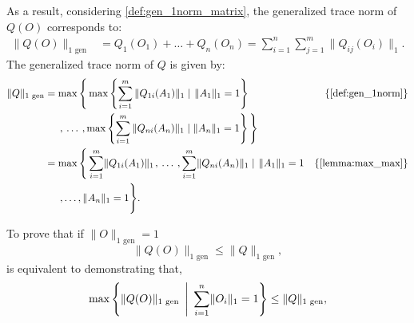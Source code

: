 As a result, considering \autoref{def:gen_1norm_matrix}, the generalized trace norm of $Q(O)$ corresponds to:
\begin{equation} \label{eq:qo}
  \begin{split}
  \lVert Q(O)  \rVert_{1 \text{ gen}} & = Q_1(O_1) + \ldots + Q_n(O_n)=  \sum_{i=1}^{n} \sum_{j=1}^{m} \lVert Q_{ij} (O_{i}) \rVert_{1}.
  \end{split}
\end {equation}
The generalized trace norm of $Q$ is given by:
\begin{equation}
  \begin{split} \label{eq:q}
  \lVert Q  \rVert_{1 \text{ gen}} & =   \max  \Bigg\{ \max \left\{ \sum_{i=1}^{m} \|Q_{1i} (A_1)\|_{1}   \mid \hspace{1pt} \|A_1\|_{1} = 1 \right\} & \{\text{\autoref{def:gen_1norm}}\} \\
  & \hspace{15pt} ,\hspace{2pt}  \ldots \hspace{2pt}  , \max \left\{ \sum_{i=1}^{m} \|Q_{ni} (A_n)\|_{1}   \mid \|A_n\|_{1} = 1 \right\} \Bigg\} \\
 & = \max \Bigg\{  \sum_{i=1}^{m}  \lVert Q_{1i} (A_{1}) \rVert_{1} \hspace{1pt} , \hspace{2pt} \ldots \hspace{2pt}, \sum_{i=1}^{m} \lVert Q_{ni} (A_{n}) \rVert_{1} \mid \hspace{1pt}   \lVert A_{1} \rVert_{1} = 1  & \{\text{\autoref{lemma:max_max}} \} \\
 & \hspace{15pt} , \ldots,\lVert A_{n} \rVert_{1} = 1 \Bigg\}.
  \end{split}
\end{equation}


To prove that  if  $\lVert O \rVert_{1 \text{ gen}} = 1$
\begin{equation}
  \lVert Q(O) \rVert_{1 \text{ gen}} \leq \lVert Q \rVert_{1 \text{ gen}},
\end{equation}
is equivalent to demonstrating that,
\begin{equation}
 \max \left\{ \lVert Q(O) \rVert_{1 \text{ gen}} \hspace{2pt}  \Biggm| \hspace{2pt}  \sum_{i=1}^{n} \lVert O_i  \rVert_1 = 1 \right\} \leq \lVert Q \rVert_{1 \text{ gen}},
\end{equation}


